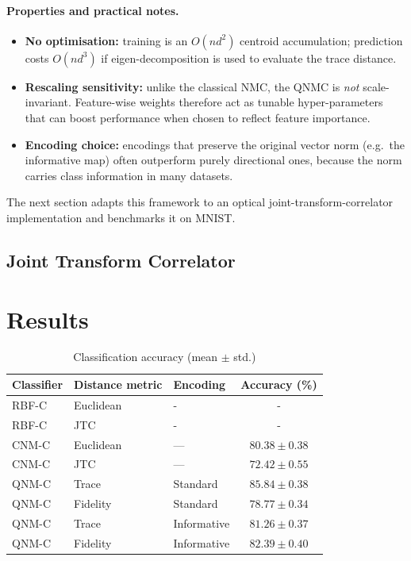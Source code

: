 \documentclass[twocolumn]{article} %
\begin{document}
\paragraph{Properties and practical notes.}
\begin{itemize}[leftmargin=*,nosep]
  \item \textbf{No optimisation:} training is an $O(nd^{2})$ centroid
        accumulation; prediction costs $O(nd^{3})$ if eigen-decomposition is
        used to evaluate the trace distance.
  \item \textbf{Rescaling sensitivity:} unlike the classical NMC, the
        QNMC is \emph{not} scale-invariant.  Feature-wise weights
        therefore act as tunable hyper-parameters that can boost
        performance when chosen to reflect feature importance.
  \item \textbf{Encoding choice:} encodings that preserve the original
        vector norm (e.g.\ the informative map) often outperform purely
        directional ones, because the norm carries class information in
        many datasets.
\end{itemize}

The next section adapts this framework to an optical
joint-transform-correlator implementation and benchmarks it on
MNIST.


\subsection{Joint Transform Correlator}

\section{Results}

\begin{table}[htbp]
  \centering
  \caption{Classification accuracy (mean $\pm$ std.)}
  \label{tab:cls-results}
  \begin{tabular}{@{}lll c@{}}
    \toprule
    Classifier & Distance metric & Encoding & Accuracy (\%)\\ 
    \midrule
    RBF-C & Euclidean & - & - \\
    RBF-C & JTC & - & - \\[2pt]
    CNM-C & Euclidean & — & $80.38 \pm 0.38$ \\ 
    CNM-C & JTC & — & $72.42 \pm 0.55$ \\[2pt]
    QNM-C & Trace     & Standard     & \textbf{$85.84 \pm 0.38$} \\ 
    QNM-C & Fidelity  & Standard     & $78.77 \pm 0.34$ \\[2pt]
    QNM-C & Trace     & Informative  & $81.26 \pm 0.37$ \\ 
    QNM-C & Fidelity  & Informative  & \textbf{$82.39 \pm 0.40$} \\ 
    \bottomrule
  \end{tabular}
\end{table}
\end{document}
